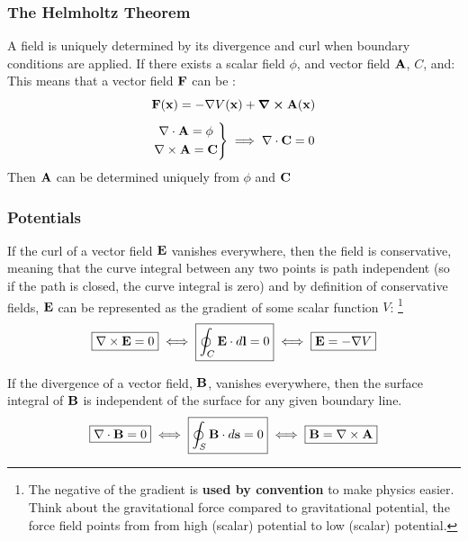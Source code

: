     \subsubsection*{The Helmholtz Theorem}
        A field is uniquely determined by its divergence and curl when boundary conditions are applied. If there exists a scalar field \(\phi\), and vector field \(\vb{A}\), \(C\), and:
        This means that a vector field \(\vb{F}\) can be :
        \begin{equation}
            \vb{F}(\vb{x})=-\nabla V(\vb{x})+\curl\vb{A}(\vb{x})
        \end{equation}
        \begin{align*}
            \left.
            \begin{gathered}
            \nabla \cdot \vb{A}= \phi
            \\
            \nabla \times \vb{A}= \vb{C}
            \end{gathered}
            \right\}
            \implies
            \nabla \cdot \vb{C} = 0
        \end{align*}
        Then \(\vb{A}\) can be determined uniquely from $\phi$ and $\vb{C}$
    \subsubsection*{Potentials}
        If the curl of a vector field $\vb{E}$ vanishes everywhere, then the field is conservative, meaning that the curve integral between any two points is path independent (so if the path is closed, the curve integral is zero) and by definition of conservative fields, $\vb{E}$ can be represented as the gradient of some scalar function $V$:
        \footnote{The negative of the gradient is \textbf{used by convention} to make physics easier. Think about the gravitational force compared to gravitational potential, the force field points from from high (scalar) potential to low (scalar) potential.}
        \begin{align*}
            \boxed{\nabla \times \vb{E} = 0} 
            \iff
            \boxed{\oint_C \vb{E}\cdot d\vb{l}=0} 
            \iff
            \boxed{\vb{E} = -\nabla V}
        \end{align*}

        If the divergence of a vector field, $\vb{B}$, vanishes everywhere, then the surface integral of $\vb{B}$ is independent of the surface for any given boundary line. 
        \begin{align*}
            \boxed{\nabla \cdot \vb{B} = 0} 
            \iff
            \boxed{\oint_S\vb{B}\cdot d\vb{s}=0}
            \iff
            \boxed{\vb{B} = \nabla \times \vb{A}}
        \end{align*}
%